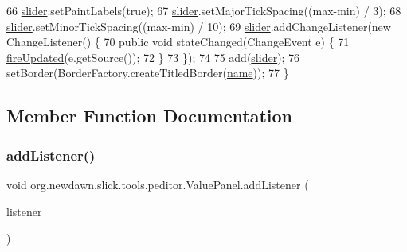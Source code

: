 \begin{DoxyCode}
66         \mbox{\hyperlink{classorg_1_1newdawn_1_1slick_1_1tools_1_1peditor_1_1_value_panel_a7b5cc531a99541b95b43875ab0e9766f}{slider}}.setPaintLabels(\textcolor{keyword}{true});
67         \mbox{\hyperlink{classorg_1_1newdawn_1_1slick_1_1tools_1_1peditor_1_1_value_panel_a7b5cc531a99541b95b43875ab0e9766f}{slider}}.setMajorTickSpacing((max-min) / 3);
68         \mbox{\hyperlink{classorg_1_1newdawn_1_1slick_1_1tools_1_1peditor_1_1_value_panel_a7b5cc531a99541b95b43875ab0e9766f}{slider}}.setMinorTickSpacing((max-min) / 10);
69         \mbox{\hyperlink{classorg_1_1newdawn_1_1slick_1_1tools_1_1peditor_1_1_value_panel_a7b5cc531a99541b95b43875ab0e9766f}{slider}}.addChangeListener(\textcolor{keyword}{new} ChangeListener() \{
70             \textcolor{keyword}{public} \textcolor{keywordtype}{void} stateChanged(ChangeEvent e) \{
71                 \mbox{\hyperlink{classorg_1_1newdawn_1_1slick_1_1tools_1_1peditor_1_1_value_panel_a26186da0cc3082d426c54cc7cc94aefe}{fireUpdated}}(e.getSource());
72             \}
73         \});
74         
75         add(\mbox{\hyperlink{classorg_1_1newdawn_1_1slick_1_1tools_1_1peditor_1_1_value_panel_a7b5cc531a99541b95b43875ab0e9766f}{slider}});
76         setBorder(BorderFactory.createTitledBorder(\mbox{\hyperlink{classorg_1_1newdawn_1_1slick_1_1tools_1_1peditor_1_1_value_panel_ac3f651b9e3f21c979dc9f3c7df17da3a}{name}}));
77     \}
\end{DoxyCode}


\subsection{Member Function Documentation}
\mbox{\label{classorg_1_1newdawn_1_1slick_1_1tools_1_1peditor_1_1_value_panel_a59d66d887ca6a03762f54b8d0a9a75bd}} 
\subsubsection{\texorpdfstring{add\+Listener()}{addListener()}}
{\footnotesize\ttfamily void org.\+newdawn.\+slick.\+tools.\+peditor.\+Value\+Panel.\+add\+Listener (\begin{DoxyParamCaption}\item[{\mbox{\hyperlink{interfaceorg_1_1newdawn_1_1slick_1_1tools_1_1peditor_1_1_input_panel_listener}{Input\+Panel\+Listener}}}]{listener }\end{DoxyParamCaption})\hspace{0.3cm}{\ttfamily [inline]}}

